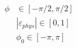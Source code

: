 \begin{align*}
\phi &\in \left[-\pi /2,\pi /2\right]\\
& \left|\varepsilon_{phys}\right| \in \left[0,1\right]\\
& \phi_0 \in \left[-\pi,\pi\right]
\end{align*}